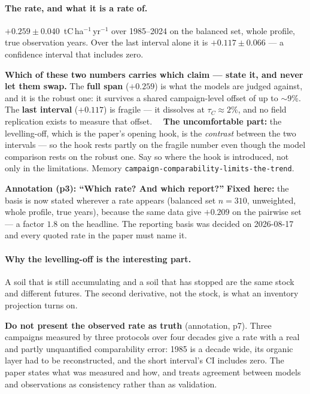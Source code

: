 \documentclass[11pt]{article}
\begin{document}
\paragraph{The rate, and what it is a rate of.} $+0.259 \pm 0.040$~tC\,ha$^{-1}$\,yr$^{-1}$ over
1985--2024 on the balanced set, whole profile, true observation years. Over the last interval alone
it is $+0.117 \pm 0.066$ --- a confidence interval that includes zero.
\begin{warn}
\textbf{Which of these two numbers carries which claim --- state it, and never let them swap.} The
\textbf{full span} ($+0.259$) is what the models are judged against, and it is the robust one: it
survives a shared campaign-level offset of up to $\sim$9\%. The \textbf{last interval} ($+0.117$) is
fragile --- it dissolves at $\tau_C\approx2\%$, and no field replication exists to measure that
offset. \ \raisebox{0pt}{$\bigstar$}~\textbf{The uncomfortable part:} the levelling-off, which is the
paper's opening hook, is the \emph{contrast} between the two intervals --- so the hook rests partly on
the fragile number even though the model comparison rests on the robust one. Say so where the hook is
introduced, not only in the limitations. Memory \texttt{campaign-comparability-limits-the-trend}.
\end{warn}
\begin{ann}
\textbf{Annotation (p3): ``Which rate? And which report?''} \textbf{Fixed here:} the basis is now
stated wherever a rate appears (balanced set $n=310$, unweighted, whole profile, true years), because
the same data give $+0.209$ on the pairwise set --- a factor $1.8$ on the headline. The reporting
basis was decided on 2026-08-17 and every quoted rate in the paper must name it.
\end{ann}

\paragraph{Why the levelling-off is the interesting part.} A soil that is still accumulating and a
soil that has stopped are the same stock and different futures. The second derivative, not the
stock, is what an inventory projection turns on.

\begin{warn}
\textbf{Do not present the observed rate as truth} (annotation, p7). Three campaigns measured by
three protocols over four decades give a rate with a real and partly unquantified comparability
error: 1985 is a decade wide, its organic layer had to be reconstructed, and the short interval's
CI includes zero. The paper states what was measured and how, and treats agreement between models
and observations as consistency rather than as validation.
\end{warn}
\end{document}
